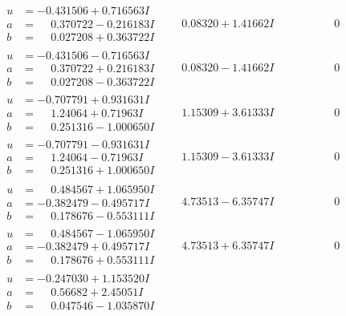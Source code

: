 \documentclass[1p]{elsarticle_modified}
\theoremstyle{definition}
\begin{document}
$$\begin{array}{c|c|c}
\begin{aligned}
u &= -0.431506 + 0.716563 I \\
a &= \phantom{-}0.370722 - 0.216183 I \\
b &= \phantom{-}0.027208 + 0.363722 I\end{aligned}
 & \phantom{-}0.08320 + 1.41662 I & \phantom{-0.000000 } 0 \\ \hline\begin{aligned}
u &= -0.431506 - 0.716563 I \\
a &= \phantom{-}0.370722 + 0.216183 I \\
b &= \phantom{-}0.027208 - 0.363722 I\end{aligned}
 & \phantom{-}0.08320 - 1.41662 I & \phantom{-0.000000 } 0 \\ \hline\begin{aligned}
u &= -0.707791 + 0.931631 I \\
a &= \phantom{-}1.24064 + 0.71963 I \\
b &= \phantom{-}0.251316 - 1.000650 I\end{aligned}
 & \phantom{-}1.15309 + 3.61333 I & \phantom{-0.000000 } 0 \\ \hline\begin{aligned}
u &= -0.707791 - 0.931631 I \\
a &= \phantom{-}1.24064 - 0.71963 I \\
b &= \phantom{-}0.251316 + 1.000650 I\end{aligned}
 & \phantom{-}1.15309 - 3.61333 I & \phantom{-0.000000 } 0 \\ \hline\begin{aligned}
u &= \phantom{-}0.484567 + 1.065950 I \\
a &= -0.382479 - 0.495717 I \\
b &= \phantom{-}0.178676 - 0.553111 I\end{aligned}
 & \phantom{-}4.73513 - 6.35747 I & \phantom{-0.000000 } 0 \\ \hline\begin{aligned}
u &= \phantom{-}0.484567 - 1.065950 I \\
a &= -0.382479 + 0.495717 I \\
b &= \phantom{-}0.178676 + 0.553111 I\end{aligned}
 & \phantom{-}4.73513 + 6.35747 I & \phantom{-0.000000 } 0 \\ \hline\begin{aligned}
u &= -0.247030 + 1.153520 I \\
a &= \phantom{-}0.56682 + 2.45051 I \\
b &= \phantom{-}0.047546 - 1.035870 I\end{aligned}

\end{array}$$
\end{document}
